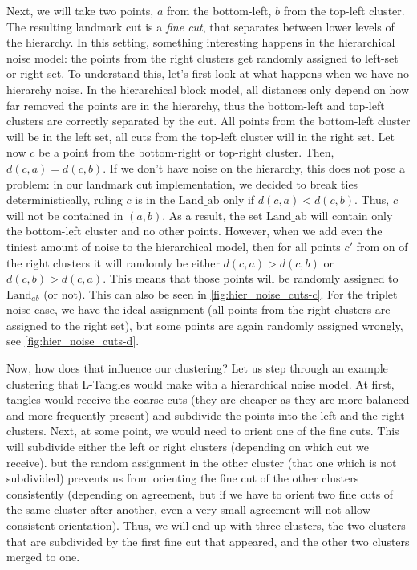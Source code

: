 Next, we will take two points, $a$ from the bottom-left, $b$ from the top-left cluster. The resulting landmark cut is a \textit{fine cut}, that separates between lower levels of the hierarchy.
In this setting, something interesting happens in the hierarchical noise model: the points from the right clusters get randomly assigned to left-set or right-set. 
To understand this, let's first look at what happens when we have no hierarchy noise. 
In the hierarchical block model, all distances only depend on how far removed the points are in the hierarchy, 
thus the bottom-left and top-left clusters are correctly separated by the cut. All points from
the bottom-left cluster will be in the left set, all cuts from the top-left cluster will in the right set.
Let now $c$ be a point from the bottom-right or top-right cluster. Then, $d(c,a) = d(c,b)$. 
If we don't have noise on the hierarchy, this does not pose a problem: in our landmark cut implementation, we decided to break ties deterministically, ruling $c$ is in the 
$\text{Land_{ab}} $ only if $d(c,a) < d(c,b)$. Thus, $c$ will not be contained in $(a,b)$. As a result, the set $\text{Land_{ab}} $ will contain 
only the bottom-left cluster and no other points.
However, when we add even the tiniest amount of noise to the hierarchical model, then for all points $c'$ from on of the right clusters 
it will randomly be either $d(c,a) > d(c,b)$ or $d(c,b) > d(c,a)$. This means that those points will be randomly assigned to $\text{Land}_{ab}$ (or not).
This can also be seen in \autoref{fig:hier_noise_cuts-c}. For the triplet noise case, we have the ideal assignment (all points from the right clusters are assigned to the right set), 
but some points are again randomly assigned wrongly, see \autoref{fig:hier_noise_cuts-d}.

Now, how does that influence our clustering? Let us step through an example clustering that L-Tangles would make with a hierarchical noise model. 
At first, tangles would receive the coarse cuts (they are cheaper as they are more balanced and more frequently present) and subdivide the points into the
left and the right clusters. Next, at some point, we would need to orient one of the fine cuts. This will subdivide either the left or right clusters (depending on which cut we receive). but
the random assignment in the other cluster (that one which is not subdivided) prevents us from orienting the fine cut of the other clusters consistently (depending on agreement, but if we 
have to orient two fine cuts of the same cluster after another, even a very small agreement will not allow consistent orientation). Thus, we will end up with three clusters, the two clusters that are
subdivided by the first fine cut that appeared, and the other two clusters merged to one. 

